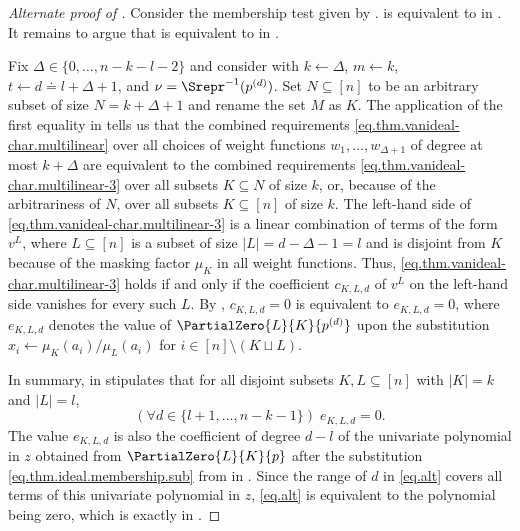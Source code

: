 \documentclass{toc}
\begin{document}
\begin{proof}[Alternate proof of ]
Consider the membership test given by .  is equivalent to 
 in . It remains to argue that  is equivalent to  in . 

Fix $\Delta \in \{0,\dots,n-k-l-2\}$ and consider   with $k \gets \Delta$, $m \gets k$, $t \gets d \doteq l+\Delta+1$, and $\nu = \Srepr^{-1}(p^{(d)})$. Set $N \subseteq [n]$ to be an arbitrary subset of size $N=k+\Delta+1$ and rename the set $M$ as $K$. The application of the first equality in  tells us that the combined requirements \eqref{eq.thm.vanideal-char.multilinear} over all choices of weight functions \(w_1,\ldots,w_{\Delta+1}\) of degree at most \(k+\Delta\) are equivalent to the combined requirements
\eqref{eq.thm.vanideal-char.multilinear-3} over all subsets $K \subseteq N$ of size $k$, or, because of the arbitrariness of $N$, over all subsets $K \subseteq [n]$ of size $k$. The left-hand side of \eqref{eq.thm.vanideal-char.multilinear-3} is a linear combination of terms of the form $v^L$, where $L \subseteq [n]$ is a subset of size $|L|=d-\Delta-1=l$ and is disjoint from $K$ because of the masking factor $\mu_K$ in all weight functions. Thus, \eqref{eq.thm.vanideal-char.multilinear-3} holds if and only if the coefficient $c_{K,L,d}$ of $v^L$ on the left-hand side vanishes for every such $L$. By , $c_{K,L,d}=0$ is equivalent to $e_{K,L,d}=0$, where $e_{K,L,d}$ denotes the value of $\PartialZero{L}{K}{p^{(d)}}$ upon the substitution $x_i\gets \mu_K(a_i)/\mu_L(a_i)$ for $i \in [n]\setminus (K \sqcup L)$.

In summary,  in
 stipulates that for all disjoint subsets $K,L \subseteq [n]$ with $|K|=k$ and $|L|=l$,
\begin{equation}\label{eq.alt}
(\forall d \in \{l+1,\dots,n-k-1\}) \; e_{K,L,d} = 0.
\end{equation}
The value $e_{K,L,d}$ is also the coefficient of degree $d-l$ of the univariate polynomial in $z$ obtained from $\PartialZero{L}{K}{p}$ after the substitution  \eqref{eq.thm.ideal.membership.sub} from  in . Since the range of $d$ in \eqref{eq.alt} covers all terms of this univariate polynomial in $z$, \eqref{eq.alt} is equivalent to the polynomial being zero, which is exactly  in .
\end{proof}
\end{document}

